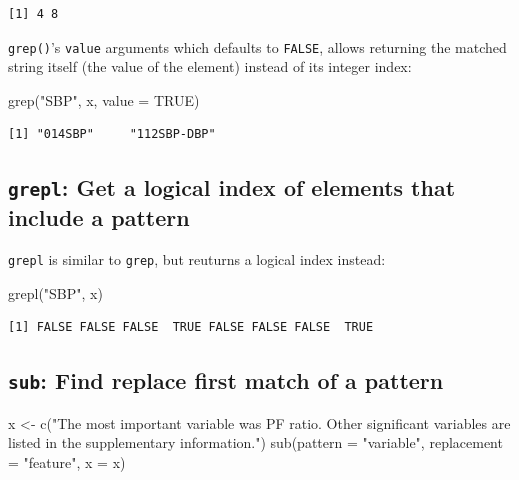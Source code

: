\documentclass[
]{book}
\newenvironment{Shaded}{\begin{snugshade}}{\end{snugshade}}
\newcommand{\AttributeTok}[1]{\textcolor[rgb]{0.77,0.63,0.00}{#1}}
\newcommand{\ConstantTok}[1]{\textcolor[rgb]{0.00,0.00,0.00}{#1}}
\newcommand{\FunctionTok}[1]{\textcolor[rgb]{0.00,0.00,0.00}{#1}}
\newcommand{\NormalTok}[1]{#1}
\newcommand{\OtherTok}[1]{\textcolor[rgb]{0.56,0.35,0.01}{#1}}
\newcommand{\StringTok}[1]{\textcolor[rgb]{0.31,0.60,0.02}{#1}}
\begin{document}
\begin{verbatim}
[1] 4 8
\end{verbatim}

\texttt{grep()}'s \texttt{value} arguments which defaults to \texttt{FALSE}, allows returning the matched string itself (the value of the element) instead of its integer index:

\begin{Shaded}
\begin{Highlighting}[]
\FunctionTok{grep}\NormalTok{(}\StringTok{"SBP"}\NormalTok{, x, }\AttributeTok{value =} \ConstantTok{TRUE}\NormalTok{)}
\end{Highlighting}
\end{Shaded}

\begin{verbatim}
[1] "014SBP"     "112SBP-DBP"
\end{verbatim}

\hypertarget{grepl-get-a-logical-index-of-elements-that-include-a-pattern}{%
\subsection{\texorpdfstring{\texttt{grepl}: Get a logical index of elements that include a pattern}{grepl: Get a logical index of elements that include a pattern}}\label{grepl-get-a-logical-index-of-elements-that-include-a-pattern}}

\texttt{grepl} is similar to \texttt{grep}, but reuturns a logical index instead:

\begin{Shaded}
\begin{Highlighting}[]
\FunctionTok{grepl}\NormalTok{(}\StringTok{"SBP"}\NormalTok{, x)}
\end{Highlighting}
\end{Shaded}

\begin{verbatim}
[1] FALSE FALSE FALSE  TRUE FALSE FALSE FALSE  TRUE
\end{verbatim}

\hypertarget{sub-find-replace-first-match-of-a-pattern}{%
\subsection{\texorpdfstring{\texttt{sub}: Find replace \textbf{first} match of a pattern}{sub: Find replace first match of a pattern}}\label{sub-find-replace-first-match-of-a-pattern}}

\begin{Shaded}
\begin{Highlighting}[]
\NormalTok{x }\OtherTok{\textless{}{-}} \FunctionTok{c}\NormalTok{(}\StringTok{"The most important variable was PF ratio. Other significant variables are listed in the supplementary information."}\NormalTok{)}
\FunctionTok{sub}\NormalTok{(}\AttributeTok{pattern =} \StringTok{"variable"}\NormalTok{, }\AttributeTok{replacement =} \StringTok{"feature"}\NormalTok{, }\AttributeTok{x =}\NormalTok{ x)}
\end{Highlighting}
\end{Shaded}
\end{document}
